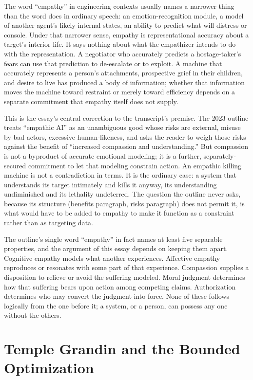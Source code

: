 \documentclass[11pt]{article}
\begin{document}
The word ``empathy'' in engineering contexts usually names a narrower thing than the word does in ordinary speech: an emotion-recognition module, a model of another agent's likely internal states, an ability to predict what will distress or console. Under that narrower sense, empathy is representational accuracy about a target's interior life. It says nothing about what the empathizer intends to do with the representation. A negotiator who accurately predicts a hostage-taker's fears can use that prediction to de-escalate or to exploit. A machine that accurately represents a person's attachments, prospective grief in their children, and desire to live has produced a body of information; whether that information moves the machine toward restraint or merely toward efficiency depends on a separate commitment that empathy itself does not supply.

This is the essay's central correction to the transcript's premise. The 2023 outline treats ``empathic AI'' as an unambiguous good whose risks are external, misuse by bad actors, excessive human-likeness, and asks the reader to weigh those risks against the benefit of ``increased compassion and understanding.'' But compassion is not a byproduct of accurate emotional modeling; it is a further, separately-secured commitment to let that modeling constrain action. An empathic killing machine is not a contradiction in terms. It is the ordinary case: a system that understands its target intimately and kills it anyway, its understanding undiminished and its lethality undeterred. The question the outline never asks, because its structure (benefits paragraph, risks paragraph) does not permit it, is what would have to be added to empathy to make it function as a constraint rather than as targeting data.

The outline's single word ``empathy'' in fact names at least five separable properties, and the argument of this essay depends on keeping them apart. Cognitive empathy models what another experiences. Affective empathy reproduces or resonates with some part of that experience. Compassion supplies a disposition to relieve or avoid the suffering modeled. Moral judgment determines how that suffering bears upon action among competing claims. Authorization determines who may convert the judgment into force. None of these follows logically from the one before it; a system, or a person, can possess any one without the others.

\section{Temple Grandin and the Bounded Optimization}
\end{document}
